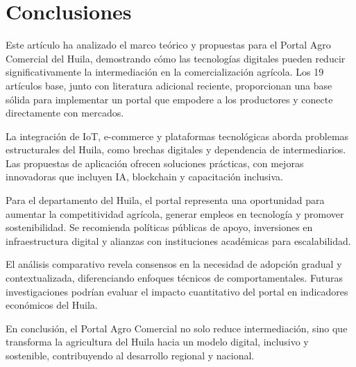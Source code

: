 \section{Conclusiones}

Este artículo ha analizado el marco teórico y propuestas para el Portal Agro Comercial del Huila, demostrando cómo las tecnologías digitales pueden reducir significativamente la intermediación en la comercialización agrícola. Los 19 artículos base, junto con literatura adicional reciente, proporcionan una base sólida para implementar un portal que empodere a los productores y conecte directamente con mercados.

La integración de IoT, e-commerce y plataformas tecnológicas aborda problemas estructurales del Huila, como brechas digitales y dependencia de intermediarios. Las propuestas de aplicación ofrecen soluciones prácticas, con mejoras innovadoras que incluyen IA, blockchain y capacitación inclusiva.

Para el departamento del Huila, el portal representa una oportunidad para aumentar la competitividad agrícola, generar empleos en tecnología y promover sostenibilidad. Se recomienda políticas públicas de apoyo, inversiones en infraestructura digital y alianzas con instituciones académicas para escalabilidad.

El análisis comparativo revela consensos en la necesidad de adopción gradual y contextualizada, diferenciando enfoques técnicos de comportamentales. Futuras investigaciones podrían evaluar el impacto cuantitativo del portal en indicadores económicos del Huila.

En conclusión, el Portal Agro Comercial no solo reduce intermediación, sino que transforma la agricultura del Huila hacia un modelo digital, inclusivo y sostenible, contribuyendo al desarrollo regional y nacional.
